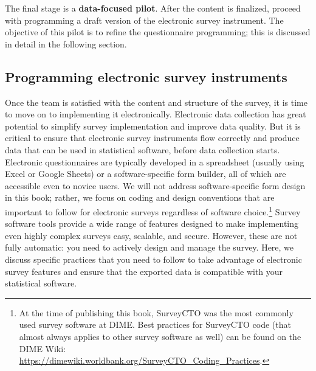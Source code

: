 \documentclass[
]{book}
\begin{document}
The final stage is a \textbf{data-focused pilot}.
After the content is finalized, proceed with programming a draft version
of the electronic survey instrument.
The objective of this pilot is to refine the questionnaire programming;
this is discussed in detail in the following section.

\hypertarget{programming-electronic-survey-instruments}{%
\subsection*{Programming electronic survey instruments}\label{programming-electronic-survey-instruments}}

Once the team is satisfied with the content and structure of the survey,
it is time to move on to implementing it electronically.
Electronic data collection has great potential
to simplify survey implementation and improve data quality.
But it is critical to ensure that electronic survey instruments
flow correctly and produce data that can be used in statistical software,
before data collection starts.
Electronic questionnaires are typically developed
in a spreadsheet (usually using Excel or Google Sheets)
or a software-specific form builder,
all of which are accessible even to novice users.
We will not address software-specific form design in this book;
rather, we focus on coding and design conventions that are important to follow
for electronic surveys regardless of software choice.\footnote{At the time of publishing this book,
  SurveyCTO was the most commonly used survey software at DIME.
  Best practices for SurveyCTO code
  (that almost always applies to other survey software as well)
  can be found on the DIME Wiki:
  \url{https://dimewiki.worldbank.org/SurveyCTO_Coding_Practices}.}
Survey software tools provide a wide range of features
designed to make implementing even highly complex surveys
easy, scalable, and secure.
However, these are not fully automatic:
you need to actively design and manage the survey.
Here, we discuss specific practices that you need to follow
to take advantage of electronic survey features
and ensure that the exported data
is compatible with your statistical software.
\end{document}
